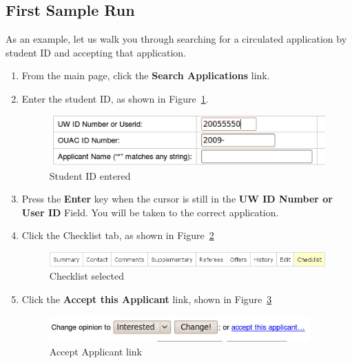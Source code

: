 \documentclass[titlepage]{article}
\begin{document}
\subsection{First Sample Run}
 \label{tFirstRun}
As an example, let us walk you through searching for a circulated application by
student ID and accepting that application.
\begin{enumerate}
\item From the main page, click the \textbf{\textsf{Search Applications}} link.
\item Enter the student ID, as shown in Figure~\ref{nSID}.
  \begin{figure}[h!]
    \begin{center}
      \includegraphics[width=13cm]{nsid.png}
    \end{center}
    \caption{Student ID entered}
    \label{nSID}
  \end{figure}
\item Press the \textbf{\textsf{Enter}} key when the cursor is still in the \textbf{\textsf{UW ID Number or User ID}} Field.  You will be taken to the correct application.
\item Click the Checklist tab, as shown in Figure~\ref{nChecklist}
  \begin{figure}[h!]
    \begin{center}
      \includegraphics[width=15cm]{apptabs_checklist.png}
    \end{center}
    \caption{Checklist selected}
    \label{nChecklist}
  \end{figure}
\item Click the \textbf{\textsf{Accept this Applicant}} link, shown in Figure~\ref{nAccept}
  \begin{figure}[h!]
    \begin{center}
      \includegraphics[width=10cm]{nAccept.png}
    \end{center}
    \caption{Accept Applicant link}
    \label{nAccept}
  \end{figure}
\end{enumerate}
\end{document}
